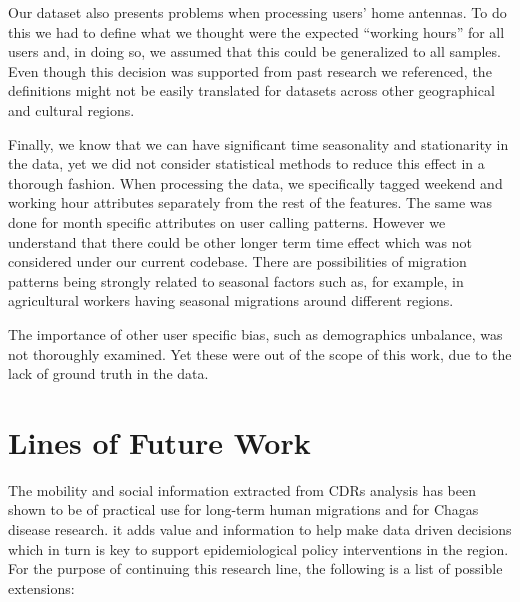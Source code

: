 Our dataset also presents problems when processing users' home antennas.
To do this we had to define what we thought were the expected ``working hours'' for all users and, in doing so, we assumed that this could be generalized to all samples. %
Even though this decision was supported from past research we referenced, the definitions might not be easily translated for datasets across other geographical and cultural regions.


Finally, we know that we can have significant time seasonality and stationarity in the data, yet we did not consider statistical methods to reduce this effect in a thorough fashion. %
When processing the data, we specifically tagged weekend and working hour attributes separately from the rest of the features.
The same was done for month specific attributes on user calling patterns.
However we understand that there could be other longer term time effect which was not considered under our current codebase. %
There are possibilities of migration patterns being strongly related to seasonal factors such as, for example, in agricultural workers having seasonal migrations around different regions.%

The importance of other user specific bias, such as demographics unbalance, was not thoroughly examined.
Yet these were out of the scope of this work, due to the lack of ground truth in the data.




\section{ Lines of Future Work }

The mobility and social information extracted from CDRs analysis has been shown to be of practical use for long-term human migrations and for Chagas disease research.
it adds value and information to help make data driven decisions which in turn is key to support epidemiological policy interventions in the region.
For the purpose of continuing this research line, the following is a list of possible extensions:


